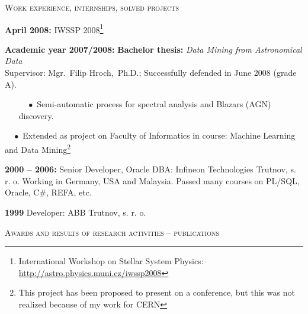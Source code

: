 \begin{cv}
\begin{cvlist}{\large \textsc{Work experience, internships, solved projects}}
\item {\bf{April 2008:}} IWSSP 2008\footnote{International Workshop on
  Stellar System Physics:
  \href{http://astro.physics.muni.cz/iwssp2008}{http://astro.physics.muni.cz/iwssp2008}}



\item {\bf{Academic year 2007/2008:}} {\bf{Bachelor thesis:}}
  \textit{Data Mining from Astronomical Data}\\Supervisor:
  Mgr.~Filip Hroch,~Ph.D.; Successfully defended in June 2008 (grade
  A).
\vspace{-0.3cm}
\begin{itemize}
\item[$\quad \bullet$ \hspace{-1.5mm}] Semi-automatic process for
  spectral analysis and Blazars (AGN) discovery.\\[-5mm]

\end{itemize}

\item[$\quad \bullet$ \hspace{-1.5mm}] Extended as project on Faculty
  of Informatics in course: Machine Learning and Data
  Mining\footnote{This project has been proposed to present on a
    conference, but this was not realized because of my work for CERN
  } \\[-5mm]


\item {\bf{2000 -- 2006:}} Senior Developer, Oracle DBA: Infineon
  Technologies Trutnov, s. r. o. Working in Germany, USA and
  Malaysia. Passed many courses on PL/SQL, Oracle, C\#, REFA, etc.

\item {\bf{1999}} Developer: ABB Trutnov, s. r. o.




\end{cvlist}




\noindent\hrulefill
\begin{cvlist}{\large \textsc{Awards and results of research activities -- publications}}



\end{cvlist}
\end{cv}
